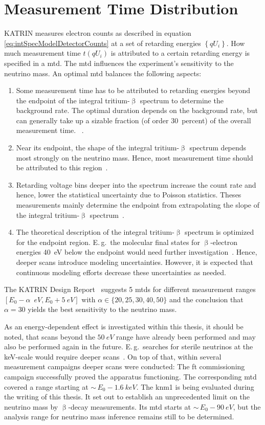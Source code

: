 \section{Measurement Time Distribution}
\label{sec:intSpecModelMTD}
KATRIN measures electron counts as described in equation \eqref{eq:intSpecModelDetectorCounts} at a set of retarding energies $\left\{qU_i\right\}$. How much measurement time $t(qU_i)$ is attributed to a certain retarding energy is specified in a \gls{mtd}. The \gls{mtd} influences the experiment's sensitivity to the neutrino mass. An optimal \gls{mtd} balances the following aspects:
\begin{enumerate}
	\item Some measurement time has to be attributed to retarding energies beyond the endpoint of the integral tritium-$\upbeta$ spectrum to determine the background rate. The optimal duration depends on the background rate, but can generally take up a sizable fraction (of order \SI{30}{percent}) of the overall measurement time. ~\cite{Angrik:2005ep}.
	\item Near its endpoint, the shape of the integral tritium-$\upbeta$ spectrum depends most strongly on the neutrino mass. Hence, most measurement time should be attributed to this region~\cite{Angrik:2005ep}.
	\item Retarding voltage bins deeper into the spectrum increase the count rate and hence, lower the statistical uncertainty due to Poisson statistics. Theses measurements mainly determine the endpoint from extrapolating the slope of the integral tritium-$\upbeta$ spectrum~\cite{Angrik:2005ep}.
	\item The theoretical description of the integral tritium-$\upbeta$ spectrum is optimized for the endpoint region. E.\,g.~the molecular final states for $\upbeta$-electron energies \SI{40}{eV} below the endpoint would need further investigation~\cite{Doss:2006}. Hence, deeper scans introduce modeling uncertainties. However, it is expected that continuous modeling efforts decrease these uncertainties as needed.
\end{enumerate}
The KATRIN Design Report~\cite{Angrik:2005ep} suggests 5 \gls{mtd}s for different measurement ranges $[E_0-\alpha\;\SI{}{eV}, E_0 + \SI{5}{eV}]$ with $\alpha \in \{20, 25, 30, 40, 50\}$ and the conclusion that $\alpha=30$ yields the best sensitivity to the neutrino mass.

As an energy-dependent effect is investigated within this thesis, it should be noted, that scans beyond the $\SI{50}{eV}$ range have already been performed and may also be performed again in the future. E.\,g.~searches for sterile neutrinos at the keV-scale would require deeper scans~\cite{Mertens2019}. On top of that, within several measurement campaigns deeper scans were conducted: The \gls{ft} commissioning campaign successfully proved the apparatus functioning. The corresponding \gls{mtd} covered a range starting at $\sim\,E_0-\SI{1.6}{keV}$. The \gls{knm1} is being evaluated during the writing of this thesis. It set out to establish an unprecedented limit on the neutrino mass by $\upbeta$-decay measurements. Its \gls{mtd} starts at $\sim\,E_0-\SI{90}{eV}$, but the analysis range for neutrino mass inference remains still to be determined.

